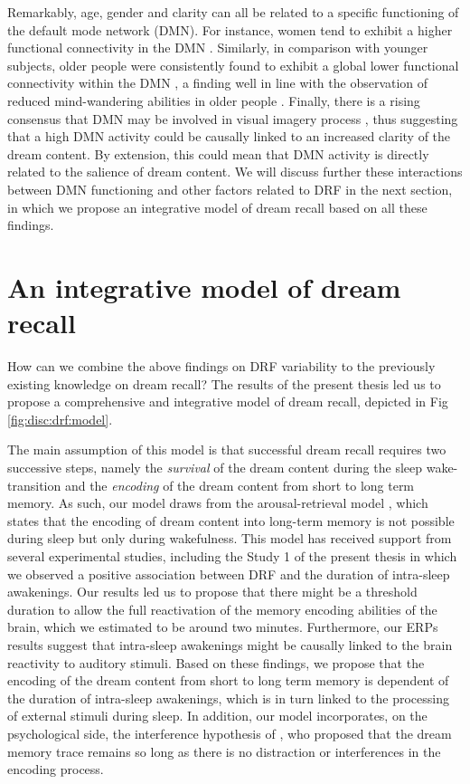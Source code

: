 Remarkably, age, gender and clarity can all be related to a specific functioning of the default mode network (DMN). For instance, women tend to exhibit a higher functional connectivity in the DMN \citep{bluhm_default_2008}. Similarly, in comparison with younger subjects, older people were consistently found to exhibit a global lower functional connectivity within the DMN \citep{damoiseaux_reduced_2008, koch_effects_2010}, a finding well in line with the observation of reduced mind-wandering abilities in older people \citep{jackson_mind-wandering_2012}. Finally, there is a rising consensus that DMN may be involved in visual imagery process \citep{andrews-hanna_functional-anatomic_2010}, thus suggesting that a high DMN activity could be causally linked to an increased clarity of the dream content. By extension, this could mean that DMN activity is directly related to the salience of dream content. We will discuss further these interactions between DMN functioning and other factors related to DRF in the next section, in which we propose an integrative model of dream recall based on all these findings.

\section{An integrative model of dream recall}
\label{disc:drf:model}

How can we combine the above findings on DRF variability to the previously existing knowledge on dream recall?
The results of the present thesis led us to propose a comprehensive and integrative model of dream recall, depicted in Fig \ref{fig:disc:drf:model}.

The main assumption of this model is that successful dream recall requires two successive steps, namely the \emph{survival} of the dream content during the sleep wake-transition and the \emph{encoding} of the dream content from short to long term memory. As such, our model draws from the arousal-retrieval model \citep{koulack_dream_1976}, which states that the encoding of dream content into long-term memory is not possible during sleep but only during wakefulness. This model has received support from several experimental studies, including the Study 1 of the present thesis in which we observed a positive association between DRF and the duration of intra-sleep awakenings. Our results led us to propose that there might be a threshold duration to allow the full reactivation of the memory encoding abilities of the brain, which we estimated to be around two minutes. Furthermore, our ERPs results suggest that intra-sleep awakenings might be causally linked to the brain reactivity to auditory stimuli. Based on these findings, we propose that the encoding of the dream content from short to long term memory is dependent of the duration of intra-sleep awakenings, which is in turn linked to the processing of external stimuli during sleep. In addition, our model incorporates, on the psychological side, the interference hypothesis of \citet{cohen_dream_1973}, who proposed that the dream memory trace remains so long as there is no distraction or interferences in the encoding process.

